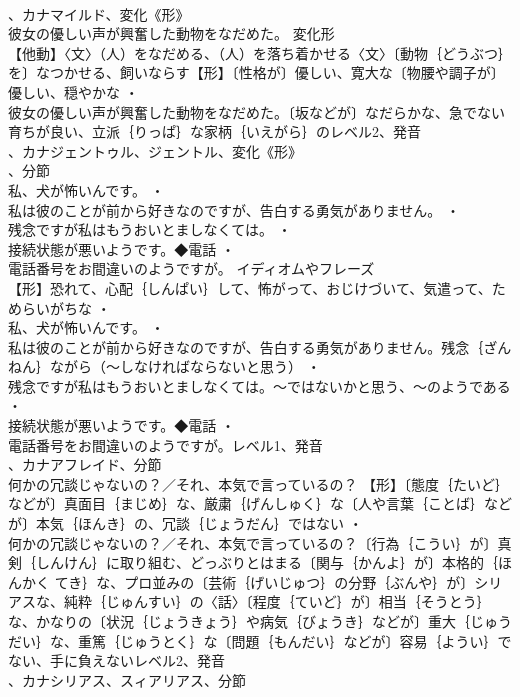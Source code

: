 \documentclass[8pt]{extreport}
\begin{document}
\begin{CJK}{UTF8}{min}
\\	、カナマイルド、変化《形》
\\	彼女の優しい声が興奮した動物をなだめた。	変化形 
\\	【他動】〈文〉（人）をなだめる、（人）を落ち着かせる〈文〉〔動物｛どうぶつ｝を〕なつかせる、飼いならす【形】〔性格が〕優しい、寛大な〔物腰や調子が〕優しい、穏やかな ・
\\	彼女の優しい声が興奮した動物をなだめた。〔坂などが〕なだらかな、急でない育ちが良い、立派｛りっぱ｝な家柄｛いえがら｝のレベル2、発音
\\	、カナジェントゥル、ジェントル、変化《形》
\\	、分節
\\	私、犬が怖いんです。 ・
\\	私は彼のことが前から好きなのですが、告白する勇気がありません。 ・
\\	残念ですが私はもうおいとましなくては。 ・
\\	接続状態が悪いようです。◆電話 ・
\\	電話番号をお間違いのようですが。	イディオムやフレーズ 
\\	【形】恐れて、心配｛しんぱい｝して、怖がって、おじけづいて、気遣って、ためらいがちな ・
\\	私、犬が怖いんです。 ・
\\	私は彼のことが前から好きなのですが、告白する勇気がありません。残念｛ざんねん｝ながら（～しなければならないと思う） ・
\\	残念ですが私はもうおいとましなくては。～ではないかと思う、～のようである ・
\\	接続状態が悪いようです。◆電話 ・
\\	電話番号をお間違いのようですが。レベル1、発音
\\	、カナアフレイド、分節
\\	何かの冗談じゃないの？／それ、本気で言っているの？		【形】〔態度｛たいど｝などが〕真面目｛まじめ｝な、厳粛｛げんしゅく｝な〔人や言葉｛ことば｝などが〕本気｛ほんき｝の、冗談｛じょうだん｝ではない ・
\\	何かの冗談じゃないの？／それ、本気で言っているの？〔行為｛こうい｝が〕真剣｛しんけん｝に取り組む、どっぶりとはまる〔関与｛かんよ｝が〕本格的｛ほんかく てき｝な、プロ並みの〔芸術｛げいじゅつ｝の分野｛ぶんや｝が〕シリアスな、純粋｛じゅんすい｝の〈話〉〔程度｛ていど｝が〕相当｛そうとう｝な、かなりの〔状況｛じょうきょう｝や病気｛びょうき｝などが〕重大｛じゅうだい｝な、重篤｛じゅうとく｝な〔問題｛もんだい｝などが〕容易｛ようい｝でない、手に負えないレベル2、発音
\\	、カナシリアス、スィアリアス、分節

\end{CJK}
\end{document}
